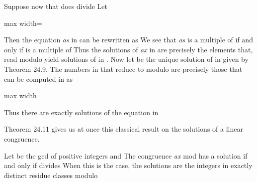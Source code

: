 \documentclass[11pt,oneside]{article}
\begin{document}
\begin{BookBody}
Suppose now that  does divide  Let

\begin{center}\begin{adjustbox}{max width=\linewidth}\end{adjustbox}\end{center}

\noindent Then the equation\textit{ as}  in  can be rewritten as  We see that\textit{ as}  is a multiple of  if and only if  is a multiple of  Thus the solutions  of\textit{ ax}  in  are precisely the elements that, read modulo  yield solutions of  in . Now let  be the unique solution of  in  given by Theorem 24.9. The numbers in  that reduce to  modulo  are precisely those that can be computed in  as

\begin{center}\begin{adjustbox}{max width=\linewidth}\end{adjustbox}\end{center}

\noindent Thus there are exactly  solutions of the equation in  \BookEnd{\blacklozenge}

Theorem 24.11 gives us at once this classical result on the solutions of a linear congruence.

 Let  be the gcd of positive integers  and  The congruence\textit{ ax} mod  has a solution if and only if  divides  When this is the case, the solutions are the integers in exactly  distinct residue classes modulo \BookEnd{\blacklozenge}


\end{BookBody}
\end{document}
